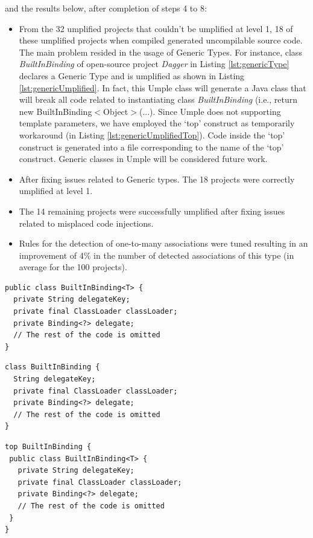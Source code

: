 and the results below, after completion of steps 4 to 8:
\begin{itemize}
\item  From the 32 umplified projects that couldn't be umplified at level 1, 18 of these umplified projects when compiled generated uncompilable source code. The main problem resided in the usage of Generic Types. For instance, class \textit{BuiltInBinding} of open-source project \textit{Dagger} in Listing \ref{lst:genericType} declares a Generic Type and is umplified as shown in Listing \ref{lst:genericUmplified}. In fact, this Umple class will generate a Java class that will break all code related to instantiating class \textit{BuiltInBinding} (i.e., return new BuiltInBinding$<$Object$>$(...).
Since Umple does not supporting template parameters, we have employed the `top' construct as temporarily workaround (in Listing \ref{lst:genericUmplifiedTop}). Code inside the `top' construct is generated into a file corresponding to the name of the `top' construct. Generic classes in Umple will be considered future work.
\item After fixing issues related to Generic types. The 18 projects were correctly umplified at level 1.
\item The 14 remaining projects were successfully umplified after fixing issues related to misplaced code injections.
\item Rules for the detection of one-to-many associations were tuned resulting in an improvement of 4\% in the number of detected associations of this type (in average for the 100 projects).
\end{itemize}

\begin{lstlisting}[style=java, caption=BuiltInBinding.java, label=lst:genericType]
public class BuiltInBinding<T> {
  private String delegateKey;
  private final ClassLoader classLoader;
  private Binding<?> delegate;
  // The rest of the code is omitted
}
\end{lstlisting}

\begin{lstlisting}[style=umpleIn, caption=BuiltInBinding.ump (Invalid), label=lst:genericUmplified]
class BuiltInBinding {
  String delegateKey;
  private final ClassLoader classLoader;
  private Binding<?> delegate;
  // The rest of the code is omitted
}
\end{lstlisting}

\begin{lstlisting}[style=umpleIn, caption=BuiltInBinding.ump using the Top construct, label=lst:genericUmplifiedTop]
top BuiltInBinding {
 public class BuiltInBinding<T> {
   private String delegateKey;
   private final ClassLoader classLoader;
   private Binding<?> delegate;
   // The rest of the code is omitted
 }
}
\end{lstlisting}

